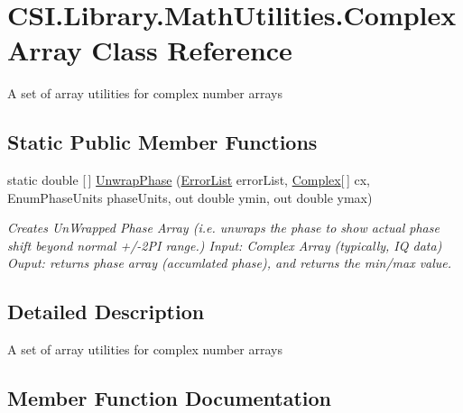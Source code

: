 \hypertarget{class_c_s_i_1_1_library_1_1_math_utilities_1_1_complex_array}{}\section{C\+S\+I.\+Library.\+Math\+Utilities.\+Complex\+Array Class Reference}
\label{class_c_s_i_1_1_library_1_1_math_utilities_1_1_complex_array}


A set of array utilities for complex number arrays  


\subsection*{Static Public Member Functions}
\begin{DoxyCompactItemize}
\item 
static double \mbox{[}$\,$\mbox{]} \mbox{\hyperlink{class_c_s_i_1_1_library_1_1_math_utilities_1_1_complex_array_ac4ade4de1ded20fe2358f0839eb738c2}{Unwrap\+Phase}} (\mbox{\hyperlink{class_c_s_i_1_1_library_1_1_errors_1_1_error_list}{Error\+List}} error\+List, \mbox{\hyperlink{struct_c_s_i_1_1_library_1_1_data_types_1_1_complex}{Complex}}\mbox{[}$\,$\mbox{]} cx, Enum\+Phase\+Units phase\+Units, out double ymin, out double ymax)
\begin{DoxyCompactList}\small\item\em Creates Un\+Wrapped Phase Array (i.\+e. unwraps the phase to show actual phase shift beyond normal +/-\/2\+PI range.) Input\+: Complex Array (typically, IQ data) Ouput\+: returns phase array (accumlated phase), and returns the min/max value. \end{DoxyCompactList}\end{DoxyCompactItemize}


\subsection{Detailed Description}
A set of array utilities for complex number arrays 



\subsection{Member Function Documentation}
\mbox{\label{class_c_s_i_1_1_library_1_1_math_utilities_1_1_complex_array_ac4ade4de1ded20fe2358f0839eb738c2}} 
